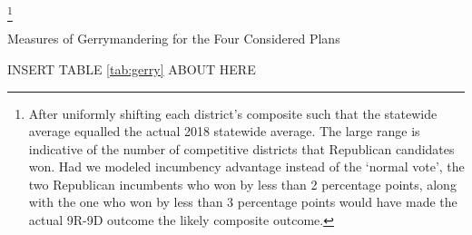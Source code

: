         \footnote{After uniformly shifting each district's composite such that the statewide average equalled the actual 2018 statewide average. The large range is indicative of the number of competitive districts that Republican candidates won. Had we modeled incumbency advantage instead of the `normal vote', the two Republican incumbents who won by less than 2 percentage points, along with the one who won by less than 3 percentage points would have made the actual 9R-9D outcome the likely composite outcome.}


\begin{center} Measures of Gerrymandering for the Four Considered Plans \end{center}
%    
\begin{center} INSERT TABLE \ref{tab:gerry} ABOUT HERE \end{center}

